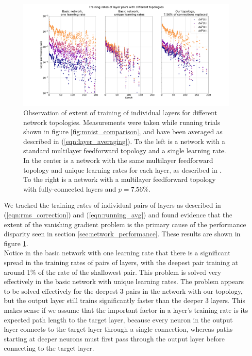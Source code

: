 \documentclass{article}
\newcommand{\npar}{\\\indent}
\begin{document}
\begin{figure}
  \centering
  \includegraphics[width=\textwidth]{figures/MNIST_individual_layers.pdf}
  \caption{Observation of extent of training of individual layers for different network topologies. Measurements were taken while running trials shown in figure \ref{fig:mnist_comparison}, and have been averaged as described in (\ref{eqn:layer_averaging}). To the left is a network with a standard multilayer feedforward topology and a single learning rate. In the center is a network with the same multilayer feedforward topology and unique learning rates for each layer, as described in \cite{scellier17}. To the right is a network with a multilayer feedforward topology with fully-connected layers and $p=7.56\%$.}
  \label{fig:mnist_layers}
\end{figure}

We tracked the training rates of individual pairs of layers as described in (\ref{eqn:rms_correction}) and (\ref{eqn:running_avg}) and found evidence that the extent of the vanishing gradient problem is the primary cause of the performance disparity seen in section \ref{sec:network_performance}. These results are shown in figure \ref{fig:mnist_layers}.
\npar
Notice in the basic network with one learning rate that there is a significant spread in the training rates of pairs of layers, with the deepest pair training at around 1\% of the rate of the shallowest pair. This problem is solved very effectively in the basic network with unique learning rates. The problem appears to be solved effectively for the deepest 3 pairs in the network with our topology, but the output layer still trains significantly faster than the deeper 3 layers. This makes sense if we assume that the important factor in a layer's training rate is its expected path length to the target layer, because every neuron in the output layer connects to the target layer through a single connection, whereas paths starting at deeper neurons must first pass through the output layer before connecting to the target layer.
\end{document}
